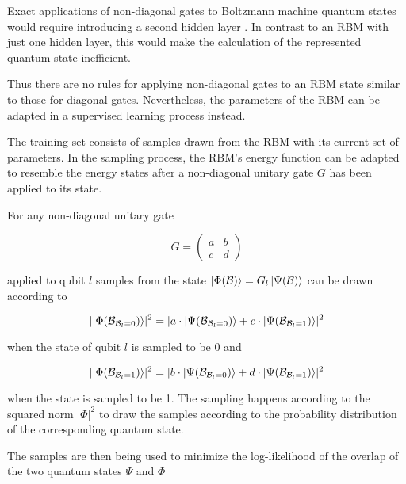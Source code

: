 Exact applications of non-diagonal gates to Boltzmann machine quantum states would require introducing a second hidden layer \cite{carleo2018constructing}. In contrast to an RBM with just one hidden layer, this would make the calculation of the represented quantum state inefficient.

Thus there are no rules for applying non-diagonal gates to an RBM state similar to those for diagonal gates. Nevertheless, the parameters of the RBM can be adapted in a 
supervised learning process instead.

The training set consists of samples drawn from the RBM with its current set of parameters. In the sampling process, the RBM's energy function can be adapted to resemble the energy states after a non-diagonal unitary gate $ G $ has been applied to its state.

For any non-diagonal unitary gate

\begin{equation}
    G =  \begin{pmatrix}
        a & b \\
        c & d
    \end{pmatrix}
\end{equation}

applied to qubit $l$ samples from the state $\ket{\Phi(\mathcal{B})} = G_l\ket{\Psi(\mathcal{B})}$ can be drawn according to 

\begin{equation}
    \lvert \ket{\Phi(\mathcal{B}_{\mathcal{B}_l = 0})} \rvert^2 = 
    \lvert  a \cdot \ket{\Psi(\mathcal{B}_{\mathcal{B}_l = 0})} +
            c \cdot \ket{\Psi(\mathcal{B}_{\mathcal{B}_l = 1})}
    \rvert^2
\end{equation}

when the state of qubit $l$ is sampled to be 0 and 

\begin{equation}
    \lvert \ket{\Phi(\mathcal{B}_{\mathcal{B}_l = 1})} \rvert^2 = 
    \lvert  b \cdot \ket{\Psi(\mathcal{B}_{\mathcal{B}_l = 0})} +
            d \cdot \ket{\Psi(\mathcal{B}_{\mathcal{B}_l = 1})}
    \rvert^2
\end{equation}

when the state is sampled to be 1. The sampling happens according to the squared norm
$\lvert \Phi \rvert^2$ to draw the samples according to the probability distribution of the 
corresponding quantum state.

The samples are then being used to minimize the log-likelihood of the overlap of the two quantum 
states $\Psi$ and $\Phi$

